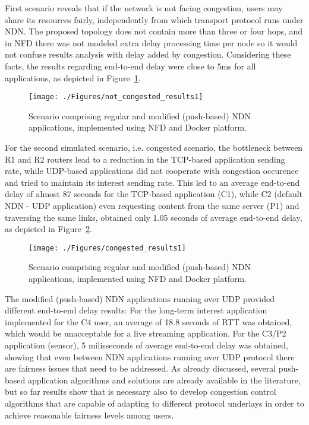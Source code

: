 \documentclass[11pt,conference]{./IEEEtran}
\begin{document}
	First scenario reveals that if the network is not facing congestion, users may share its resources fairly, independently from which transport protocol runs under NDN. The proposed topology does not contain more than three or four hops, and in NFD there was not modeled extra delay processing time per node so it would not confuse results analysis with delay added by congestion. Considering these facts, the results regarding end-to-end delay were close to 5ms for all applications, as depicted in Figure~\ref{fig:not_congested_results1}.

		\begin{figure}[ht]
			\centering
			\texttt{[image: ./Figures/not\_congested\_results1]}
			\caption{Scenario comprising regular and modified (push-based) NDN applications, implemented using NFD and Docker platform.}
			\label{fig:not_congested_results1}
		\end{figure} 


	For the second simulated scenario, i.e. congested scenario, the bottleneck between R1 and R2 routers lead to a reduction in the TCP-based application sending rate, while UDP-based applications did not cooperate with congestion occurence and tried to maintain its interest sending rate. This led to an average end-to-end delay of almost 87 seconds for the TCP-based application (C1), while C2 (default NDN - UDP application) even requesting content from the same server (P1) and traversing the same links, obtained only 1.05 seconds of average end-to-end delay, as depicted in Figure~\ref{fig:congested_results1}. 

		\begin{figure}[ht]
			\centering
			\texttt{[image: ./Figures/congested\_results1]}
			\caption{Scenario comprising regular and modified (push-based) NDN applications, implemented using NFD and Docker platform.}
			\label{fig:congested_results1}
		\end{figure} 

	The modified (push-based) NDN applications running over UDP provided different end-to-end delay results: For the long-term interest application implemented for the C4 user, an average of 18.8 seconds of RTT was obtained, which would be unacceptable for a live streaming application. For the C3/P2 application (sensor), 5 milisseconds of average end-to-end delay was obtained, showing that even between NDN applications running over UDP protocol there are fairness issues that need to be addressed. As already discussed, several push-based application algorithms and solutions are already available in the literature, but so far results show that is necessary also to develop congestion control algorithms that are capable of adapting to different protocol underlays in order to achieve reasonable fairness levels among users. 
\end{document}
